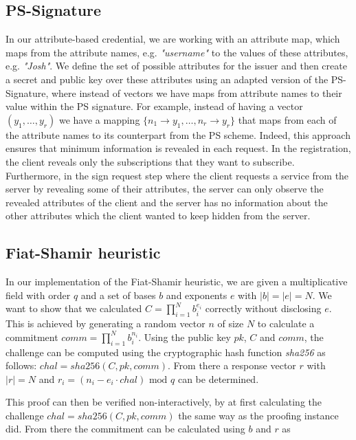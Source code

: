 \documentclass[9pt,conference]{IEEEtran}
\begin{document}
\subsection{PS-Signature}
In our attribute-based credential, we are working with an attribute map, which maps from the attribute names, e.g. \textit{"username"} to the values of these attributes, e.g. \textit{"Josh"}. We define the set of possible attributes for the issuer and then create a secret and public key over these attributes using an adapted version of the PS-Signature\cite{pointcheval2016short}, where instead of vectors we have maps from attribute names to their value within the PS signature. For example, instead of having a vector $(y_1,\ldots, y_r)$ we have a mapping $\{n_1 \rightarrow y_1, \ldots, n_r \rightarrow y_r\}$ that maps from each of the attribute names to its counterpart from the PS scheme. Indeed, this approach ensures that minimum information is revealed in each request. In the registration, the client reveals only the subscriptions that they want to subscribe. Furthermore, in the sign request step where the client requests a service from the server by revealing some of their attributes, the server can only observe the revealed attributes of the client and the server has no information about the other attributes which the client wanted to keep hidden from the server.

\subsection{Fiat-Shamir heuristic}
In our implementation of the Fiat-Shamir heuristic\cite{10.1007/3-540-47721-7_12}, we are given a multiplicative field with order $q$ and a set of bases $b$ and exponents $e$ with ${|b| = |e| = N}$. We want to show that we calculated ${C = \prod_{i=1}^{N}{b_i^{e_i}}}$ correctly without disclosing $e$. This is achieved by generating a random vector $n$ of size $N$ to calculate a commitment ${comm = \prod_{i=1}^{N}{b_i^{n_i}}}$. Using the public key $pk$, $C$ and $comm$, the challenge can be computed using the cryptographic hash function \textit{sha256} as follows: ${chal = sha256(C, pk, comm)}$. From there a response vector $r$ with $|r| = N$ and ${r_i = (n_i - e_i \cdot chal) \text{ mod } q}$ can be determined.

This proof can then be verified non-interactively, by at first calculating the challenge ${chal = sha256(C, pk, comm)}$ the same way as the proofing instance did. From there the commitment can be calculated using $b$ and $r$ as
\end{document}
